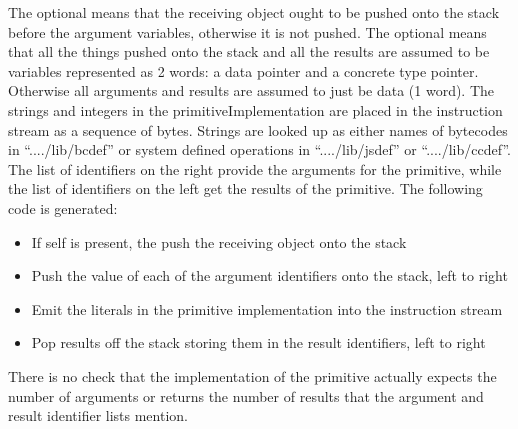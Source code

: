 The optional  means that the receiving object ought to be
pushed onto the stack before the argument variables, otherwise it is not
pushed.  The optional  means that all the things pushed onto the stack
and all the results are assumed to be variables represented as 2 words:  a
data pointer and a concrete type pointer.  Otherwise all arguments and
results are assumed to just be data (1 word).  The strings and integers
in the primitiveImplementation are placed in
the instruction stream as a sequence of bytes.  Strings are looked up as
either names of bytecodes in ``..../lib/bcdef'' or system defined operations
in ``..../lib/jsdef'' or ``..../lib/ccdef''.
The list of identifiers on the right provide the
arguments for the primitive, while the list of identifiers on the left
get the results of the primitive.  The following code is
generated:

\begin{itemize}
  \item{} If self is present, the push the receiving object onto the stack
  \item{} Push the value of each of the argument identifiers onto the stack,
      left to right 
  \item{} Emit the literals in the primitive implementation into the
      instruction stream
  \item{} Pop results off the stack storing them in the result identifiers,
      left to right 
\end{itemize}

There is no check that the implementation of the primitive actually expects
the number of arguments or returns the number of results that the
argument and result identifier lists mention.
